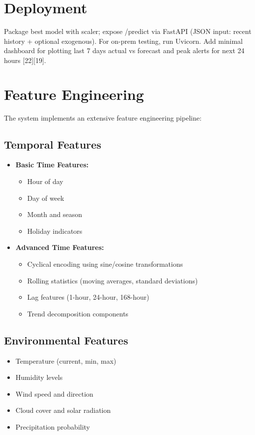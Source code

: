 \documentclass[12pt,a4paper]{report}
\begin{document}
\section{Deployment}
Package best model with scaler; expose /predict via FastAPI (JSON input: recent history + optional exogenous). For on-prem testing, run Uvicorn. Add minimal dashboard for plotting last 7 days actual vs forecast and peak alerts for next 24 hours [22][19].

\section{Feature Engineering}
The system implements an extensive feature engineering pipeline:

\subsection{Temporal Features}
\begin{itemize}
\item \textbf{Basic Time Features:}
  \begin{itemize}
    \item Hour of day
    \item Day of week
    \item Month and season
    \item Holiday indicators
  \end{itemize}

\item \textbf{Advanced Time Features:}
  \begin{itemize}
    \item Cyclical encoding using sine/cosine transformations
    \item Rolling statistics (moving averages, standard deviations)
    \item Lag features (1-hour, 24-hour, 168-hour)
    \item Trend decomposition components
  \end{itemize}
\end{itemize}

\subsection{Environmental Features}
\begin{itemize}
\item Temperature (current, min, max)
\item Humidity levels
\item Wind speed and direction
\item Cloud cover and solar radiation
\item Precipitation probability
\end{itemize}
\end{document}
